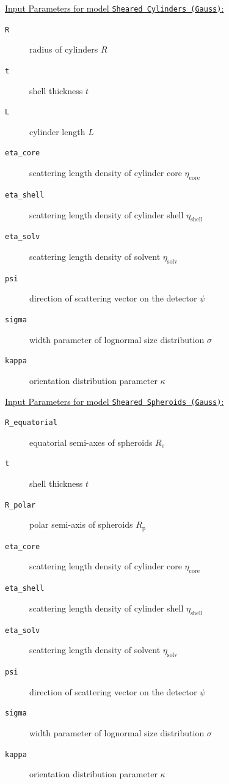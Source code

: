 \vspace{5mm}

\uline{Input Parameters for model \texttt{Sheared Cylinders (Gauss)}:}\\
\begin{description}
\item[\texttt{R}] radius of cylinders $R$
\item[\texttt{t}] shell thickness $t$
\item[\texttt{L}] cylinder length $L$
\item[\texttt{eta\_core}] scattering length density of cylinder core $\eta_\mathrm{core}$
\item[\texttt{eta\_shell}] scattering length density of cylinder shell $\eta_\mathrm{shell}$
\item[\texttt{eta\_solv}] scattering length density of solvent $\eta_\mathrm{solv}$
\item[\texttt{psi}] direction of scattering vector on the detector $\psi$
\item[{\texttt{sigma}}] width parameter of lognormal size distribution $\sigma$
\item[{\texttt{kappa}}] orientation distribution parameter $\kappa$
\end{description}

\vspace{5mm}

\uline{Input Parameters for model \texttt{Sheared Spheroids (Gauss)}:}\\
\begin{description}
\item[\texttt{R\_equatorial}] equatorial semi-axes of spheroids $R_\mathrm{e}$
\item[\texttt{t}] shell thickness $t$
\item[\texttt{R\_polar}] polar semi-axis of spheroids $R_\mathrm{p}$
\item[\texttt{eta\_core}] scattering length density of cylinder core $\eta_\mathrm{core}$
\item[\texttt{eta\_shell}] scattering length density of cylinder shell $\eta_\mathrm{shell}$
\item[\texttt{eta\_solv}] scattering length density of solvent $\eta_\mathrm{solv}$
\item[\texttt{psi}] direction of scattering vector on the detector $\psi$
\item[{\texttt{sigma}}] width parameter of lognormal size distribution $\sigma$
\item[{\texttt{kappa}}] orientation distribution parameter $\kappa$
\end{description}

